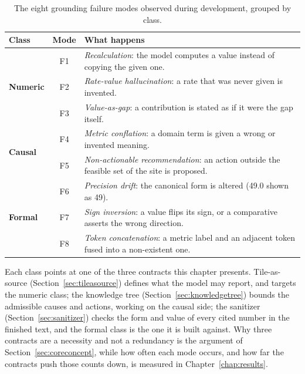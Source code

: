 \documentclass[12pt,a4paper,openright,twoside]{book}
\begin{document}
\begin{table}[ht]
  \centering
  \small
  \begin{tabular}{@{}l c p{8.5cm}@{}}
  \toprule
  \textbf{Class} & \textbf{Mode} & \textbf{What happens} \\
  \midrule
  \multirow{3}{*}{\textbf{Numeric}} & F1 & \emph{Recalculation}: the model computes a value instead of copying the given one. \\
   & F2 & \emph{Rate-value hallucination}: a rate that was never given is invented. \\
   & F3 & \emph{Value-as-gap}: a contribution is stated as if it were the gap itself. \\
  \midrule
  \multirow{2}{*}{\textbf{Causal}} & F4 &  \emph{Metric conflation}: a domain term is given a wrong or invented meaning. \\
   & F5 & \emph{Non-actionable recommendation}: an action outside the feasible set of the site is proposed. \\
  \midrule
  \multirow{3}{*}{\textbf{Formal}} & F6 & \emph{Precision drift}: the canonical form is altered (49.0 shown as 49). \\
   & F7 & \emph{Sign inversion}: a value flips its sign, or a comparative asserts the wrong direction. \\
   & F8 & \emph{Token concatenation}: a metric label and an adjacent token fused into a non-existent one. \\
  \bottomrule
  \end{tabular}

  \vspace{0.3cm}

  \caption{The eight grounding failure modes observed during development, grouped by class.}
  \label{tab:catalogue}
\end{table}

Each class points at one of the three contracts this chapter presents.
Tile-as-source (Section~\ref{sec:tileasource}) defines what the model may report, and targets the numeric class; the knowledge tree (Section~\ref{sec:knowledgetree}) bounds the admissible causes and actions, working on the causal side; the sanitizer (Section~\ref{sec:sanitizer}) checks the form and value of every cited number in the finished text, and the formal class is the one it is built against.
Why three contracts are a necessity and not a redundancy is the argument of Section~\ref{sec:coreconcept}, while how often each mode occurs, and how far the contracts push those counts down, is measured in Chapter~\ref{chap:results}.
\end{document}
